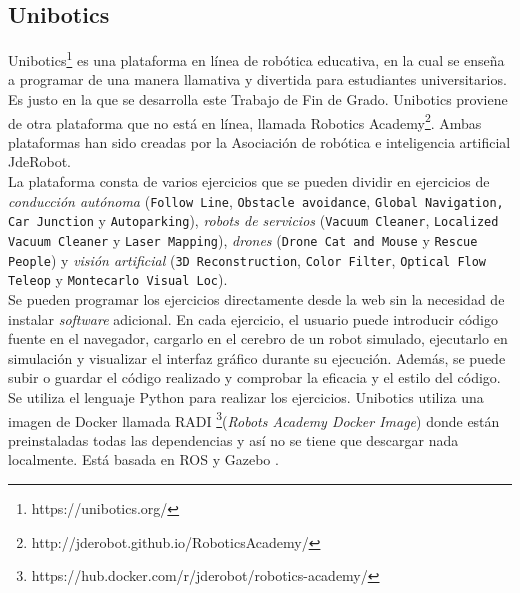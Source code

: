 \subsection{Unibotics}

Unibotics\footnote{https://unibotics.org/} es una plataforma en línea de robótica educativa, en la cual se enseña a programar de una manera llamativa y divertida para estudiantes universitarios. Es justo en la que se desarrolla este Trabajo de Fin de Grado. Unibotics proviene de otra plataforma que no está en línea, llamada Robotics Academy\footnote{http://jderobot.github.io/RoboticsAcademy/}. Ambas plataformas han sido creadas por la Asociación de robótica e inteligencia artificial JdeRobot.\\

\newpage
La plataforma consta de varios ejercicios que se pueden dividir en ejercicios de \textit{conducción autónoma} (\texttt{Follow Line}, \texttt{Obstacle avoidance}, \texttt{Global Navigation, Car Junction} y \texttt{Autoparking}), \textit{robots de servicios} (\texttt{Vacuum Cleaner}, \texttt{Localized Vacuum Cleaner} y \texttt{Laser Mapping}), \textit{drones} (\texttt{Drone Cat and Mouse} y \texttt{Rescue People}) y \textit{visión artificial} (\texttt{3D Reconstruction}, \texttt{Color Filter}, \texttt{Optical Flow Teleop} y \texttt{Montecarlo Visual Loc}).\\

Se pueden programar los ejercicios directamente desde la web sin la necesidad de instalar \textit{software} adicional. En cada ejercicio, el usuario puede introducir código fuente en el navegador, cargarlo en el cerebro de un robot simulado, ejecutarlo en simulación y visualizar el interfaz gráﬁco durante su ejecución. Además, se puede subir o guardar el código realizado y comprobar la eficacia y el estilo del código. Se utiliza el lenguaje Python para realizar los ejercicios. Unibotics utiliza una imagen de Docker llamada RADI \footnote{https://hub.docker.com/r/jderobot/robotics-academy/}(\textit{Robots Academy Docker Image}) donde están preinstaladas todas las dependencias y así no se tiene que descargar nada localmente. Está basada en ROS y Gazebo \cite{robotics}.\\

